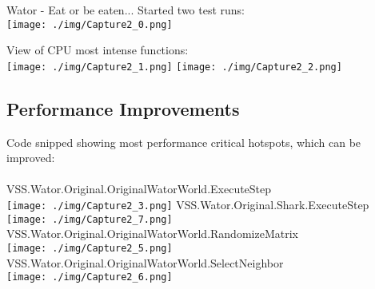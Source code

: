 \begin{section}{Wator - Eat or be eaten...}
		Started two test runs:\\
		\texttt{[image: ./img/Capture2\_0.png]}
    \FloatBarrier
		
		View of CPU most intense functions:\\
		\texttt{[image: ./img/Capture2\_1.png]}
    \FloatBarrier
		\texttt{[image: ./img/Capture2\_2.png]}
    \FloatBarrier
		
		\subsection*{Performance Improvements}
		
		Code snipped showing most performance critical hotspots, which can be improved:\\
		\\
		VSS.Wator.Original.OriginalWatorWorld.ExecuteStep\\
		\texttt{[image: ./img/Capture2\_3.png]}
    \FloatBarrier
		VSS.Wator.Original.Shark.ExecuteStep\\
		\texttt{[image: ./img/Capture2\_7.png]}
    \FloatBarrier
		VSS.Wator.Original.OriginalWatorWorld.RandomizeMatrix\\
		\texttt{[image: ./img/Capture2\_5.png]}
    \FloatBarrier
		VSS.Wator.Original.OriginalWatorWorld.SelectNeighbor\\
		\texttt{[image: ./img/Capture2\_6.png]}
    \FloatBarrier
		

\end{section}